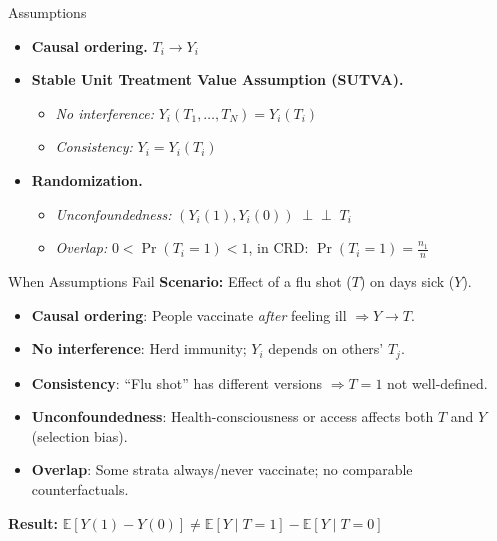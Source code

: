 \documentclass[10pt, handout]{beamer}
\theoremstyle{plain}
\newcommand{\E}{\mathbb{E}}
\begin{document}
\begin{frame}{Assumptions}


\begin{itemize}
  \item \textbf{Causal ordering.} $T_i \to Y_i$
  \pause

  \vspace{1em}
  \item \textbf{Stable Unit Treatment Value Assumption (SUTVA).}
  \setlength{\itemsep}{6pt} %
    \begin{itemize}
      \item \emph{No interference:} $Y_i(T_1,\dots,T_N)=Y_i(T_i)$
      \item \emph{Consistency:} $Y_i = Y_i(T_i)$
    \end{itemize}

  \pause
  \vspace{1em}
  \item \textbf{Randomization.}
  \setlength{\itemsep}{6pt}
    \begin{itemize}
        \item \emph{Unconfoundedness:} $(Y_i(1),Y_i(0)) \;\perp\!\!\!\perp\; T_i$
        \item \emph{Overlap:} $0<\Pr(T_i = 1) <1$, in CRD: $\Pr(T_i=1) = \frac{n_1}{n}$
    \end{itemize}
\end{itemize}
\end{frame}


\begin{frame}{When Assumptions Fail}
\textbf{Scenario:} Effect of a flu shot ($T$) on days sick ($Y$).

\pause
\vspace{1em}
\begin{itemize}
  \item \textbf{Causal ordering}: People vaccinate \emph{after} feeling ill $\Rightarrow Y \to T$.
  
  \pause
  \vspace{1em}
  \item \textbf{No interference}: Herd immunity; $Y_i$ depends on others’ $T_j$.

  \pause
  \vspace{1em}
  \item \textbf{Consistency}: “Flu shot” has different versions $\Rightarrow T{=}1$ not well-defined.

  \pause
  \vspace{1em}
  \item \textbf{Unconfoundedness}: Health-consciousness or access affects both $T$ and $Y$ (selection bias).

  \pause
  \vspace{1em}
  \item \textbf{Overlap}: Some strata always/never vaccinate; no comparable counterfactuals.
\end{itemize}

\medskip
\textbf{Result:} $\mathbb{E}[Y(1)-Y(0)] \neq \E[Y\mid T{=}1]-\E[Y\mid T{=}0]$
\end{frame}
\end{document}
